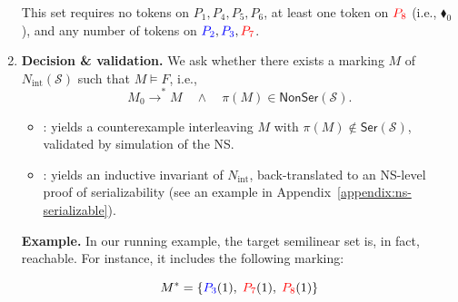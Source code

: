 \begin{enumerate}
\begin{tcolorbox}[colback=black!5!white, colframe=black, boxrule=1pt]
	This set requires no tokens on $P_1,P_4,P_5,P_6$, at least one token on $\textcolor{red}{P_8}$ (i.e., {\color{red}$\blacklozenge_0$}), and any number of tokens on $\textcolor{blue}{P_2},\textcolor{blue}{P_3},\textcolor{red}{P_7}$. 
	\end{tcolorbox} 
	
	
	
	
	\item \textbf{Decision \& validation.}
	We ask whether there exists a marking \(M\) of \(N_{\mathrm{int}}(\mathcal S)\) such that \(M \models F\), i.e.,
	\[
	M_0 \xrightarrow{}^{*} M
	\quad\wedge\quad
	\pi(M)\in \mathsf{NonSer}(\mathcal S).
	\]
	
	\begin{itemize}
		\item [\sat]: yields a counterexample interleaving \(M\) with
		\(\pi(M)\notin \mathsf{Ser}(\mathcal S)\), validated by simulation of the NS.
		
		\item [\unsat]: yields an inductive invariant of
		\(N_{\mathrm{int}}\), back-translated to an NS-level proof of serializability 
%		
(see an example in Appendix~\ref{appendix:ns-serializable}).
	\end{itemize}

\begin{tcolorbox}[colback=black!5!white, colframe=black, boxrule=1pt]
	\textbf{Example.}
	In our running example, the target semilinear set is, in fact, reachable. For instance, it includes the following marking:
	
	\[
	M^* = \{\textcolor{blue}{P_3}(1),\;\textcolor{red}{P_7}(1),\;\textcolor{red}{P_8}(1)\}
	\]
	

\end{tcolorbox}
\end{enumerate}
